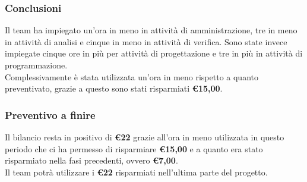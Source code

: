 \subsubsection{Conclusioni}
Il team ha impiegato un'ora in meno in attività di amministrazione, tre in meno in attività di analisi e cinque in meno in attività di verifica. Sono state invece impiegate cinque ore in più per attività di progettazione e tre in più in attività di programmazione. \\
Complessivamente è stata utilizzata un'ora in meno rispetto a quanto preventivato, grazie a questo sono stati risparmiati \textbf{\euro15,00}.

\subsubsection{Preventivo a finire}
Il bilancio resta in positivo di \textbf{\euro22} grazie all'ora in meno utilizzata in questo periodo che ci ha permesso di risparmiare \textbf{\euro15,00} e a quanto era stato risparmiato nella fasi precedenti, ovvero \textbf{\euro7,00}. \\ Il team potrà utilizzare i \textbf{\euro22} risparmiati nell'ultima parte del progetto.
